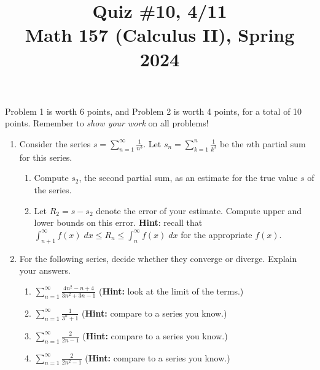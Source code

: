 \documentclass[11pt]{article}
\title{Quiz \#10, 4/11\\ Math 157 (Calculus II), Spring 2024}
\date{}
\begin{document}
\maketitle

\thispagestyle{empty}

\vspace{-2cm}

Problem 1 is worth 6 points, and Problem 2 is worth 4 points, for a total of 10 points. Remember to \emph{show your work} on all problems!

\begin{enumerate}

\item Consider the series $s = \displaystyle \sum_{n=1}^{\infty}\frac{1}{n^3}$. Let $s_n = \displaystyle \sum_{k=1}^{n} \frac{1}{k^3}$ be the $n$th partial sum for this series.

\begin{enumerate}
\item Compute $s_2$, the second partial sum, as an estimate for the true value $s$ of the series.
\item Let $R_2 = s - s_2$ denote the error of your estimate. Compute upper and lower bounds on this error. {\bf Hint}: recall that $\int_{n+1}^{\infty} f(x) \; dx \leq R_n \leq \int_{n}^{\infty} f(x) \; dx$ for the appropriate $f(x)$.
\end{enumerate}

\vspace{2.15in}

\item For the following series, decide whether they converge or diverge. Explain your answers.

\begin{enumerate}
\item $\displaystyle \sum_{n=1}^{\infty} \frac{4n^2-n+4}{3n^2+3n-1}$ \hfill ({\bf Hint:} look at the limit of the terms.)
\item $\displaystyle \sum_{n=1}^{\infty} \frac{1}{3^n + 1}$ \hfill ({\bf Hint:} compare to a series you know.)
\item $\displaystyle \sum_{n=1}^{\infty} \frac{2}{2n-1}$ \hfill ({\bf Hint:} compare to a series you know.)
\item $\displaystyle \sum_{n=1}^{\infty} \frac{2}{2n^2-1}$ \hfill ({\bf Hint:} compare to a series you know.)
\end{enumerate}

\end{enumerate}
\end{document}
